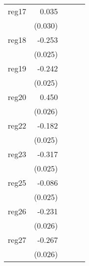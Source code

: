 {\begin{longtable}{l*{4}{D{.}{.}{-1}}}
\addlinespace
reg17       &       0.035         &                     &                     &                     \\
            &     (0.030)         &                     &                     &                     \\
\addlinespace
reg18       &      -0.253\sym{***}&                     &                     &                     \\
            &     (0.025)         &                     &                     &                     \\
\addlinespace
reg19       &      -0.242\sym{***}&                     &                     &                     \\
            &     (0.025)         &                     &                     &                     \\
\addlinespace
reg20       &       0.450\sym{***}&                     &                     &                     \\
            &     (0.026)         &                     &                     &                     \\
\addlinespace
reg22       &      -0.182\sym{***}&                     &                     &                     \\
            &     (0.025)         &                     &                     &                     \\
\addlinespace
reg23       &      -0.317\sym{***}&                     &                     &                     \\
            &     (0.025)         &                     &                     &                     \\
\addlinespace
reg25       &      -0.086\sym{***}&                     &                     &                     \\
            &     (0.025)         &                     &                     &                     \\
\addlinespace
reg26       &      -0.231\sym{***}&                     &                     &                     \\
            &     (0.026)         &                     &                     &                     \\
\addlinespace
reg27       &      -0.267\sym{***}&                     &                     &                     \\
            &     (0.026)         &                     &                     &                     \\

\end{longtable}}
